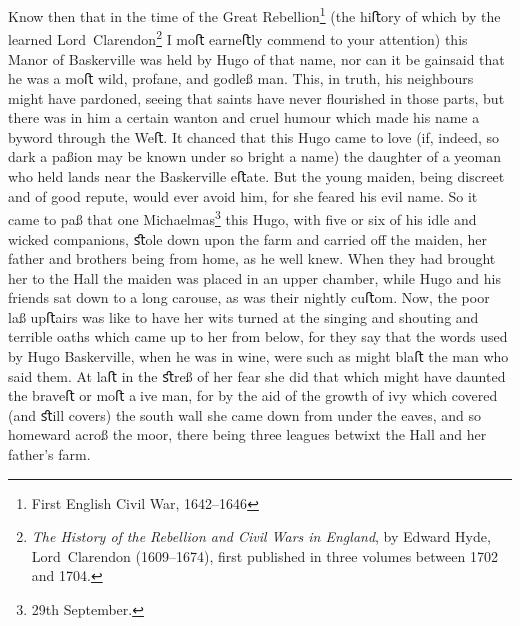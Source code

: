 \begin{withfootnotes}
Know then that in the time of the Great Rebellion\footnote{First English Civil War, 1642--1646} (the hiﬅory of which by the learned Lord~Clarendon\footnote{\textit{The History of the Rebellion and Civil Wars in England}, by Edward Hyde, Lord~Clarendon (1609--1674), first published in three volumes between 1702 and 1704.} I moﬅ earneﬅly commend to your attention) this Manor of Baskerville was held by Hugo of that name, nor can it be gainsaid that he was a moﬅ wild, profane, and godleß man. This, in truth, his neighbours might have pardoned, seeing that saints have never ﬂourished in those parts, but there was in him a certain wanton and cruel humour which made his name a byword through the Weﬅ. It chanced that this Hugo came to love (if, indeed, so dark a paßion may be known under so bright a name) the daughter of a yeoman who held lands near the Baskerville eﬅate. But the young maiden, being discreet and of good repute, would ever avoid him, for she feared his evil name. So it came to paß that one Michaelmas\footnote{29th September.} this Hugo, with ﬁve or six of his idle and wicked companions, ﬆole down upon the farm and carried oﬀ the maiden, her father and brothers being from home, as he well knew. When they had brought her to the Hall the maiden was placed in an upper chamber, while Hugo and his friends sat down to a long carouse, as was their nightly cuﬅom. Now, the poor laß upﬅairs was like to have her wits turned at the singing and shouting and terrible oaths which came up to her from below, for they say that the words used by Hugo Baskerville, when he was in wine, were such as might blaﬅ the man who said them. At laﬅ in the ﬆreß of her fear she did that which might have daunted the braveﬅ or moﬅ aive man, for by the aid of the growth of ivy which covered (and ﬆill covers) the south wall she came down from under the eaves, and so homeward acroß the moor, there being three leagues betwixt the Hall and her father's farm.
\end{withfootnotes}

